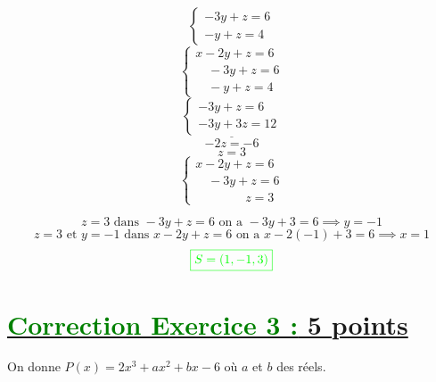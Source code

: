 \documentclass[12pt,a4paper]{article}
\begin{document}
\begin{enumerate}
    \[
\begin{cases}
        -3y+z=6 \\
        -y+z=4
    \end{cases}
    \]
        \[
    \begin{cases}
        x - 2y + z = 6 \\
        \quad -3y+z=6 \\
        \quad -y+z=4
    \end{cases}
    \]
    \[
\underline{    \begin{cases}
        -3y+z=6 \\
        -3y+3z=12
    \end{cases}}
    \]
    \[-2z=-6\]
    \[z=3\]
    \[
    \begin{cases}
        x - 2y + z = 6 \\
        \quad -3y+z=6 \\
        \quad\quad\quad\quad z=3
    \end{cases}
    \]
    
    \[z=3 \text{ dans } -3y+z=6  \text{ on a } -3y+3=6 \implies y=-1\]
    \[\text{$z=3 $ et $y=-1$ dans } x - 2y + z = 6  \text{ on a } x - 2(-1) + 3 = 6 \implies x=1\]
\[
\textcolor{green}{\boxed{S = (1,-1,3)   }} 
\]
\end{enumerate}

\section*{\underline{\textcolor{green}{Correction Exercice 3 :} 5 points}}

On donne \( P(x) = 2x^3 + ax^2 + bx - 6 \) où \( a \) et \( b \) des réels.
\end{document}
